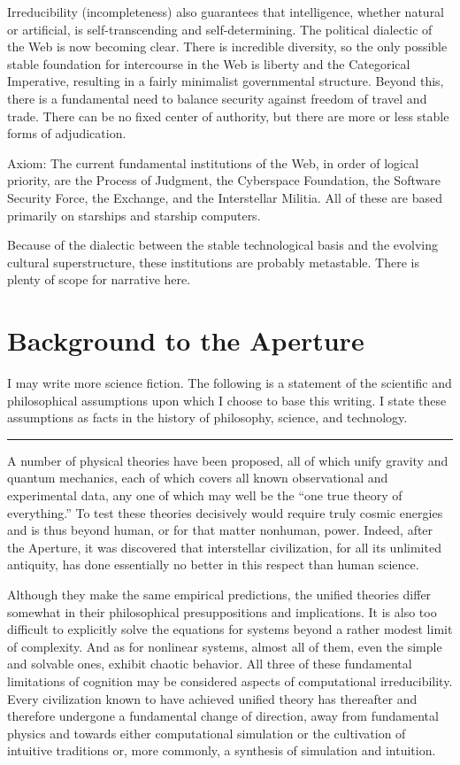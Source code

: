\documentclass[english,11pt,letterpaper,onecolumn]{scrbook}
\begin{document}
Irreducibility (incompleteness) also guarantees that intelligence, whether natural or artificial, is self-transcending and self-determining.  The political dialectic of the Web is now becoming clear.  There is incredible diversity, so the only possible stable foundation for intercourse in the Web is liberty and the Categorical Imperative, resulting in a fairly minimalist governmental structure.  Beyond this, there is a fundamental need to balance security against freedom of travel and trade.  There can be no fixed center of authority, but there are more or less stable forms of adjudication.

Axiom:	The current fundamental institutions of the Web, in order of logical priority, are the Process of Judgment, the Cyberspace Foundation, the Software Security Force, the Exchange, and the Interstellar Militia.  All of these are based primarily on starships and starship computers.

Because of the dialectic between the stable technological basis and the evolving cultural superstructure, these institutions are probably metastable.  There is plenty of scope for narrative here.

\chapter{Background to the Aperture}

	I may write more science fiction.  The following is a statement of the scientific and philosophical assumptions upon which I choose to base this writing.  I state these assumptions as facts in the history of philosophy, science, and technology.

\begin{center}\rule[3pt]{2in}{0.5pt}\end{center}

	A number of physical theories have been proposed, all of which unify gravity and quantum mechanics, each of which covers all known observational and experimental data, any one of which may well be the ``one true theory of everything.''  To test these theories decisively would require truly cosmic energies and is thus beyond human, or for that matter nonhuman, power.  Indeed, after the Aperture, it was discovered that interstellar civilization, for all its unlimited antiquity, has done essentially no better in this respect than human science.

	Although they make the same empirical predictions, the unified theories differ somewhat in their philosophical presuppositions and implications.  It is also too difficult to explicitly solve the equations for systems beyond a rather modest limit of complexity.  And as for nonlinear systems, almost all of them, even the simple and solvable ones, exhibit chaotic behavior.  All three of these fundamental limitations of cognition may be considered aspects of computational irreducibility.  Every civilization known to have achieved unified theory has thereafter and therefore undergone a fundamental change of direction, away from fundamental physics and towards either computational simulation or the cultivation of intuitive traditions or, more commonly, a synthesis of simulation and intuition.
\end{document}
